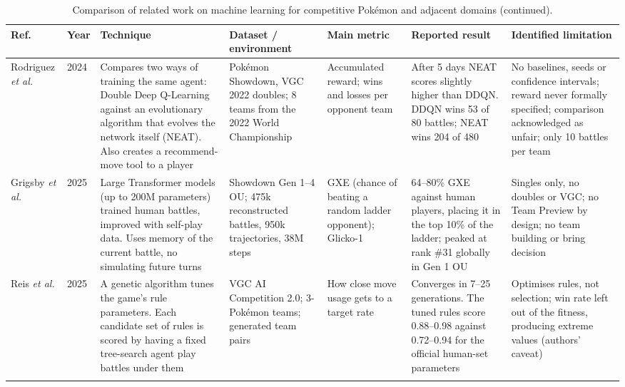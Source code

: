 \documentclass[conference]{IEEEtran}
\begin{document}
\begin{table}[!t]
\centering
\addtocounter{table}{-1}
\caption{Comparison of related work on machine learning for competitive Pok\'emon and adjacent domains (continued).}
\scriptsize
\setlength{\tabcolsep}{3pt}
\renewcommand{\arraystretch}{1.15}
\begin{tabular}{@{}p{1.4cm}p{0.5cm}p{3.0cm}p{2.8cm}p{2.0cm}p{3.5cm}p{3.3cm}@{}}
\toprule
\textbf{Ref.} & \textbf{Year} & \textbf{Technique} & \textbf{Dataset / environment} & \textbf{Main metric} & \textbf{Reported result} & \textbf{Identified limitation} \\
\midrule

Rodriguez \emph{et al.} \cite{rodriguez2024} & 2024 &
Compares two ways of training the same agent: Double Deep Q-Learning against an evolutionary algorithm that evolves the network itself (NEAT). Also creates a recommend-move tool to a player &
Pok\'emon Showdown, VGC 2022 doubles; 8 teams from the 2022 World Championship &
Accumulated reward; wins and losses per opponent team &
After 5 days NEAT scores slightly higher than DDQN. DDQN wins 53 of 80 battles; NEAT wins 204 of 480 &
No baselines, seeds or confidence intervals; reward never formally specified; comparison acknowledged as unfair; only 10 battles per team \\
\addlinespace

Grigsby \emph{et al.} \cite{grigsby2025} & 2025 &
Large Transformer models (up to 200M parameters) trained human battles, improved with self-play data. Uses memory of the current battle, no simulating future turns &
Showdown Gen 1--4 OU; 475k reconstructed battles, 950k trajectories, 38M steps &
GXE (chance of beating a random ladder opponent); Glicko-1 &
64--80\% GXE against human players, placing it in the top 10\% of the ladder; peaked at rank \#31 globally in Gen 1 OU &
Singles only, no doubles or VGC; no Team Preview by design; no team building or bring decision \\
\addlinespace

Reis \emph{et al.} \cite{reis2025} & 2025 &
A genetic algorithm tunes the game's rule parameters. Each candidate set of rules is scored by having a fixed tree-search agent play battles under them &
VGC AI Competition 2.0; 3-Pok\'emon teams; generated team pairs &
How close move usage gets to a target rate &
Converges in 7--25 generations. The tuned rules score 0.88--0.98 against 0.72--0.94 for the official human-set parameters &
Optimises rules, not selection; win rate left out of the fitness, producing extreme values (authors' caveat) \\
\addlinespace


\end{tabular}
\end{table}
\end{document}
